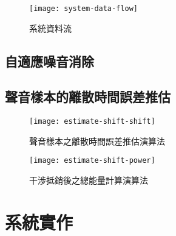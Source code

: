 \begin{figure}[H]
    \centering
    \texttt{[image: system-data-flow]}
    \caption{系統資料流}
    \label{fig:system-data-flow}
\end{figure}

\subsection{自適應噪音消除}

\subsection{聲音樣本的離散時間誤差推估}

\begin{figure}[H]
    \centering
    \texttt{[image: estimate-shift-shift]}
    \caption{聲音樣本之離散時間誤差推估演算法}
    \label{fig:estimate-shift}
\end{figure}

\begin{figure}[H]
    \centering
    \texttt{[image: estimate-shift-power]}
    \caption{干涉抵銷後之總能量計算演算法}
    \label{fig:estimate-power}
\end{figure}

\section{系統實作}